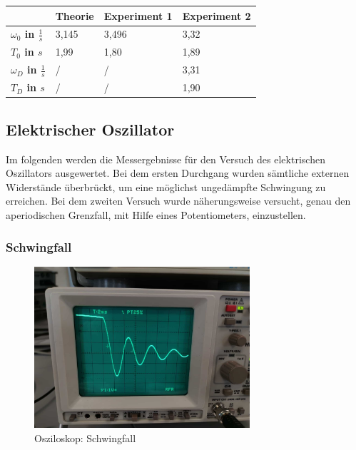 \documentclass[a4paper]{scrartcl}
\numberwithin{equation}{subsection}
\begin{document}
\begin{table}[H]
\begin{tabular}{|l|l|l|l|}
\hline
 									& \textbf{Theorie} & \textbf{Experiment 1} & \textbf{Experiment 2} \\ \hline
\textbf{$\omega_0$ in $\frac{1}{s}$} & 3,145            & 3,496                 & 3,32       	         \\ \hline
\textbf{$T_0$ in $s$}                & 1,99             & 1,80                  & 1,89        			 \\ \hline
\textbf{$\omega_D$ in $\frac{1}{s}$} & /                & /                     & 3,31        			 \\ \hline
\textbf{$T_D$ in $s$}                & /                & /                     & 1,90        			 \\ \hline
\end{tabular}
\centering
\end{table}

\subsection{Elektrischer Oszillator}
Im folgenden werden die Messergebnisse für den Versuch des elektrischen Oszillators ausgewertet. Bei dem ersten Durchgang wurden sämtliche externen Widerstände überbrückt, um eine möglichst ungedämpfte Schwingung zu erreichen. Bei dem zweiten Versuch wurde näherungsweise versucht, genau den aperiodischen Grenzfall, mit Hilfe eines Potentiometers, einzustellen.

\subsubsection{Schwingfall}

\begin{figure}[H]
\includegraphics[width=8cm]{Bild_Osziloskop-Schwingung}
\centering
\caption{Osziloskop: Schwingfall}
\centering
\end{figure}
\end{document}
